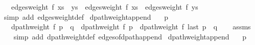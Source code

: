 \begin{isabellebody}
\ \ \ {\isachardoublequoteopen}edges{\isacharunderscore}{\kern0pt}weight\ f\ {\isacharparenleft}{\kern0pt}xs\ {\isacharat}{\kern0pt}\ ys{\isacharparenright}{\kern0pt}\ {\isacharequal}{\kern0pt}\ edges{\isacharunderscore}{\kern0pt}weight\ f\ xs\ {\isacharplus}{\kern0pt}\ edges{\isacharunderscore}{\kern0pt}weight\ f\ ys{\isachardoublequoteclose}%
\endisataginvisible
{\isafoldinvisible}%
%
\isadeliminvisible
\isanewline
%
\endisadeliminvisible
%
\isadelimproof
\ \ %
\endisadelimproof
%
\isatagproof
{}\isamarkupfalse%
\ {\isacharparenleft}{\kern0pt}simp\ add{\isacharcolon}{\kern0pt}\ edges{\isacharunderscore}{\kern0pt}weight{\isacharunderscore}{\kern0pt}def{\isacharparenright}{\kern0pt}%
\endisatagproof
{\isafoldproof}%
%
\isadelimproof
\isanewline
%
\endisadelimproof
%
\isadeliminvisible
\isanewline
%
\endisadeliminvisible
%
\isataginvisible
{}\isamarkupfalse%
\ dpath{\isacharunderscore}{\kern0pt}weight{\isacharunderscore}{\kern0pt}append{\isacharcolon}{\kern0pt}\isanewline
\ \ \ {\isachardoublequoteopen}p\ {\isasymnoteq}\ {\isacharbrackleft}{\kern0pt}{\isacharbrackright}{\kern0pt}{\isachardoublequoteclose}\isanewline
\ \ \ {\isachardoublequoteopen}dpath{\isacharunderscore}{\kern0pt}weight\ f\ {\isacharparenleft}{\kern0pt}p\ {\isacharat}{\kern0pt}\ q{\isacharparenright}{\kern0pt}\ {\isacharequal}{\kern0pt}\ dpath{\isacharunderscore}{\kern0pt}weight\ f\ p\ {\isacharplus}{\kern0pt}\ dpath{\isacharunderscore}{\kern0pt}weight\ f\ {\isacharparenleft}{\kern0pt}last\ p\ {\isacharhash}{\kern0pt}\ q{\isacharparenright}{\kern0pt}{\isachardoublequoteclose}%
\endisataginvisible
{\isafoldinvisible}%
%
\isadeliminvisible
\isanewline
%
\endisadeliminvisible
%
\isadelimproof
\ \ %
\endisadelimproof
%
\isatagproof
{}\isamarkupfalse%
\ assms\isanewline
\ \ \isamarkupfalse%
\ {\isacharparenleft}{\kern0pt}simp\ add{\isacharcolon}{\kern0pt}\ dpath{\isacharunderscore}{\kern0pt}weight{\isacharunderscore}{\kern0pt}def\ edges{\isacharunderscore}{\kern0pt}of{\isacharunderscore}{\kern0pt}dpath{\isacharunderscore}{\kern0pt}append{\isacharunderscore}{\kern0pt}{}{\isacharparenright}{\kern0pt}%
\endisatagproof
{\isafoldproof}%
%
\isadelimproof
\isanewline
%
\endisadelimproof
%
\isadeliminvisible
\isanewline
%
\endisadeliminvisible
%
\isataginvisible
{}\isamarkupfalse%
\ dpath{\isacharunderscore}{\kern0pt}weight{\isacharunderscore}{\kern0pt}append{\isacharunderscore}{\kern0pt}{}{\isacharcolon}{\kern0pt}\isanewline
\ \ \ {\isachardoublequoteopen}p\ {\isasymnoteq}\ {\isacharbrackleft}{\kern0pt}{\isacharbrackright}{\kern0pt}{\isachardoublequoteclose}\isanewline

\end{isabellebody}
